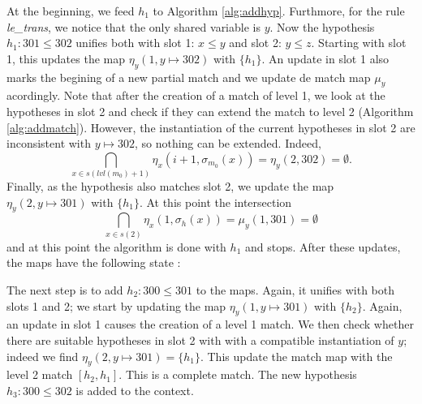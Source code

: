 \documentclass[runningheads]{llncs}
\begin{document}
At the beginning, we feed $h_1$ to Algorithm \ref{alg:addhyp}.
Furthmore, for the rule \textit{le\_trans}, we notice that the only shared variable is ${y}$.
Now the hypothesis $h_1 : 301 \leq 302$ unifies both with slot 1: $x \leq y$ and slot 2: $y \leq z$.
Starting with slot 1, this updates the map $\eta_y(1, y \mapsto 302)$ with $\{h_1\}$.
An update in slot 1 also marks the begining of a new partial match and we update de match map $\mu_y$ acordingly.
Note that after the creation of a match of level 1, we look at the hypotheses in slot 2 and check if they can extend the match to level 2 (Algorithm \ref{alg:addmatch}). However, the instantiation of the current hypotheses in slot 2 are inconsistent with $y \mapsto 302$, so nothing can be extended. Indeed,
\[ %
  \bigcap_{x\in s(lvl(m_0) + 1)} \eta_x \left(i + 1, \sigma_{m_0}(x)\right) = \eta_y(2, 302) = \emptyset.
\]
Finally, as the hypothesis also matches slot 2, we update the map $\eta_y(2, y \mapsto 301)$ with $\{h_1\}$.
At this point the intersection
\[
  \bigcap_{x\in s(2)} \eta_x \left(1, \sigma_{h}(x)\right) = \mu_y(1, 301) = \emptyset
\]
and at this point the algorithm is done with $h_1$ and stops.
After these updates, the maps have the following state :

\begin{center}
\end{center}

The next step is to add $h_2 : 300 \leq 301$ to the maps.
Again, it unifies with both slots 1 and 2; we start by updating the map $\eta_y(1, y \mapsto 301)$ with $\{h_2\}$.
Again, an update in slot 1 causes the creation of a level 1 match.
We then check whether there are suitable hypotheses in slot 2 with
with a compatible instantiation of $y$; indeed we find $\eta_y(2, y \mapsto 301) = \{h_1\}$.
This update the match map with the level 2 match $[h_2,h_1]$.
This is a complete match.
The new hypothesis $h_3 : 300 \leq 302$ is added to the context.
\end{document}
